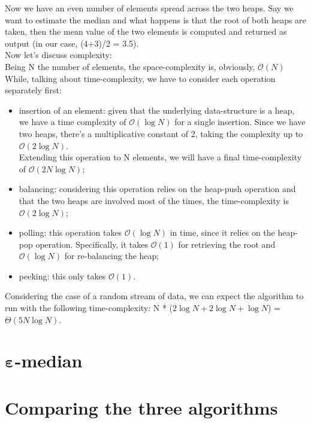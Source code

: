 \documentclass[paper=a4wide, fontsize=12pt]{scrartcl}	 %
\begin{document}
Now we have an even number of elements spread across the two heaps. Say we want to estimate the median and what happens is that the root of both heaps are taken, then the mean value of the two elements is computed and returned as output (in our case, (4+3)/2 = 3.5).
\\
Now let's discuss complexity:\\
Being N the number of elements, the space-complexity is, obviously, $\mathcal{O}(N)$ 
While, talking about time-complexity, we have to consider each operation separately first:
\begin{itemize}
    \item insertion of an element: given that the underlying data-structure is a heap, we have a time complexity of $\mathcal{O}(\log N)$ for a single insertion. Since we have two heaps, there's a multiplicative constant of 2, taking the complexity up to $\mathcal{O}(2\log N)$.\\
    Extending this operation to N elements, we will have a final time-complexity of $\mathcal{O}(2N\log N)$;
    \item balancing: considering this operation relies on the heap-push operation and that the two heaps are involved most of the times, the time-complexity is $\mathcal{O}(2\log N)$;
    \item polling: this operation takes $\mathcal{O}(\log N)$ in time, since it relies on the heap-pop operation. Specifically, it takes $\mathcal{O}(1)$ for retrieving the root and $\mathcal{O}(\log N)$ for re-balancing the heap;
    \item peeking: this only takes $\mathcal{O}(1)$.
\end{itemize}
Considering the case of a random stream of data, we can expect the algorithm to run with the following time-complexity: N * ($2\log N + 2\log N + \log N$) = $\Theta(5N\log N)$.

\section*{$\mathbf{\varepsilon}$-median}

\section*{Comparing the three algorithms}
\end{document}
